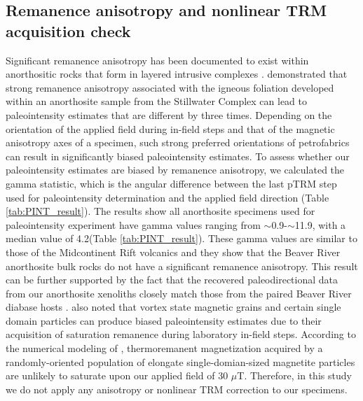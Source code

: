 \documentclass[9pt,twocolumn,twoside,lineno]{pnas-new}
\begin{document}
\subsection*{Remanence anisotropy and nonlinear TRM acquisition check}
Significant remanence anisotropy has been documented to exist within anorthositic rocks that form in layered intrusive complexes \cite{Selkin2000a, Feinberg2006a}. \cite{Selkin2000a} demonstrated that strong remanence anisotropy associated with the igneous foliation developed within an anorthosite sample from the Stillwater Complex can lead to paleointensity estimates that are different by three times. Depending on the orientation of the applied field during in-field steps and that of the magnetic anisotropy axes of a specimen, such strong preferred orientations of petrofabrics can result in significantly biased paleointensity estimates. To assess whether our paleointensity estimates are biased by remanence anisotropy, we calculated the gamma statistic, which is the angular difference between the last pTRM step used for paleointensity determination and the applied field direction (Table \ref{tab:PINT_result}). The results show all anorthosite specimens used for paleointensity experiment have gamma values ranging from $\sim$0.9\textdegree-$\sim$11.9\textdegree, with a median value of 4.2\textdegree (Table \ref{tab:PINT_result}). These gamma values are similar to those of the Midcontinent Rift volcanics \cite{Sprain2018a} and they show that the Beaver River anorthosite bulk rocks do not have a significant remanence anisotropy. This result can be further supported by the fact that the recovered paleodirectional data from our anorthosite xenoliths closely match those from the paired Beaver River diabase hosts \cite{Zhang2021b}. \cite{Selkin2007a} also noted that vortex state magnetic grains and certain single domain particles can produce biased paleointensity estimates due to their acquisition of saturation remanence during laboratory in-field steps. According to the numerical modeling of , thermoremanent magnetization acquired by a randomly-oriented population of elongate single-domian-sized magnetite particles are unlikely to saturate upon our applied field of 30 $\mu$T. Therefore, in this study we do not apply any anisotropy or nonlinear TRM correction to our specimens.

\end{document}
